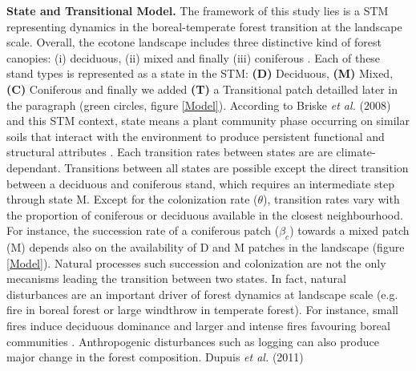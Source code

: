 %


\textbf{State and Transitional Model.} The framework of this study lies is a
STM representing dynamics in the boreal-temperate forest transition at the
landscape scale.  Overall, the ecotone landscape includes three distinctive
kind of forest canopies: (i) deciduous, (ii) mixed and finally (iii)
coniferous \cite{Fisichelli2013}.  Each of these stand types is represented as
a state in the STM: \textbf{(D)} Deciduous, \textbf{(M)} Mixed, \textbf{(C)}
Coniferous and finally we added \textbf{(T)} a Transitional patch detailled
later in the paragraph (green circles, figure \ref{Model}).  According to
Briske\textit{ et al.} (2008) and this STM context, state means a plant
community phase occurring on similar soils that interact with the environment
to produce persistent functional and structural attributes \cite{Briske2008}.
Each transition rates between states are  are climate-dependant. Transitions
between all states are possible except the direct transition between a
deciduous and coniferous stand, which requires an intermediate step through
state M. Except for the colonization rate ($\theta$), transition rates vary
with the proportion of coniferous or deciduous available in the closest
neighbourhood. For instance, the succession rate of a coniferous patch
($\beta_c$) towards a mixed patch (M) depends also on the availability of D
and M patches in the landscape (figure \ref{Model}).  Natural processes such
succession and colonization are not the only mecanisms leading the transition
between two states. In fact, natural disturbances are an important driver of
forest dynamics at landscape scale (e.g. fire in boreal forest or large
windthrow in temperate forest). For instance, small fires induce deciduous
dominance and larger and intense fires favouring boreal communities
\cite{Bergeron2004}. Anthropogenic disturbances such as logging can also
produce major change in the forest composition. Dupuis \textit{et al.} (2011)
